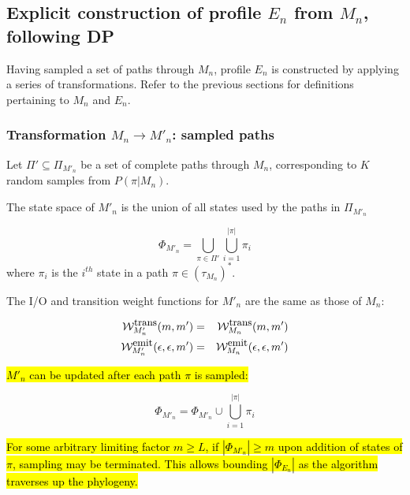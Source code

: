 \documentclass{article}
\newcommand{\seclabel}[1]{\label{sec.#1}}
\newcommand\States{\Phi}
\newcommand\statesof[1]{\States_{#1}}
\newcommand\Transitions{\tau}
\newcommand\transitionsof[1]{\Transitions_{#1}}
\newcommand\weight{{\cal W}}
\newcommand\weightfunof[1]{\weight_{#1}}
\newcommand\transweightfun[1]{\weightfunof{#1}^{\mbox{\small trans}}}
\newcommand\emitweightfun[1]{\weightfunof{#1}^{\mbox{\small emit}}}
\newcommand\numberofstates[1]{|\statesof{#1}|}
\begin{document}
\subsection{Explicit construction of profile $E_n$ from $M_n$, following DP}
\seclabel{Mn2En}

Having sampled a set of paths through $M_n$, profile $E_n$ is constructed by applying a series of transformations.
Refer to the previous sections for definitions pertaining to $M_n$ and $E_n$.

\subsubsection{Transformation $M_n \to M'_n$: sampled paths}

Let $\Pi' \subseteq \Pi_{M'_n}$ be a set of complete paths through $M_n$,
corresponding to $K$ random samples from $P(\pi|M_n)$.

The state space of $M'_n$ is the union of all states used by the paths in  $\Pi_{M'_n}$

\[ 
\statesof{M'_n} = \bigcup_{\pi \in \Pi'} \bigcup_{i=1}^{|\pi|} \pi_i  
\]
where $\pi_i$ is the $i^{th}$ state in a path $\pi \in (\transitionsof{M_n})^\ast$.

The I/O and transition weight functions for $M'_n$ are the same as those of $M_n$:

\begin{eqnarray*}
\transweightfun{M'_n}(m,m') & = & \transweightfun{M_n}(m,m') \\
\emitweightfun{M'_n}(\epsilon,\epsilon,m') & = & \emitweightfun{M_n}(\epsilon,\epsilon,m')
\end{eqnarray*}

\hl{
$M'_n$  can be updated after each path $\pi$ is sampled:}

\[
\statesof{M'_n} = \statesof{M'_n}  \cup \bigcup_{i=1}^{|\pi|} \pi_i  
\]

\hl{
For some arbitrary limiting factor $m \geq L$,  if  $\numberofstates{M'_n} \geq m$ 
upon addition of states of $\pi$, 
sampling may be terminated.  This allows bounding $\numberofstates{E_n}$ as the 
algorithm traverses up the phylogeny. 
}
\end{document}
